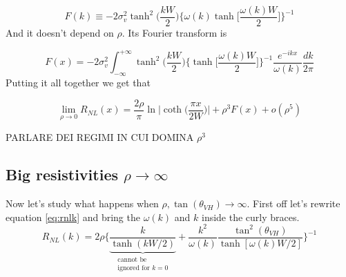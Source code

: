 \begin{equation}
    F(k)\equiv -2\sigma_v^2\tanh^2\bigg(\frac{kW}2\bigg)\bigg\{\omega(k)\tanh\bigg[\frac{\omega(k) W}2\bigg]\bigg\}^{-1}
\end{equation}
And it doesn't depend on $\rho$. Its Fourier transform is 

\begin{equation}
    F(x)=-2\sigma_{v}^2\int_{-\infty}^{+\infty}\tanh^2\bigg(\frac{kW}2\bigg)\bigg\{\tanh\bigg[\frac{\omega(k) W}2\bigg]\bigg\}^{-1}\frac{e^{-ikx}}{\omega(k)}\frac{dk}{2\pi}
\end{equation}
Putting it all together we get that

\begin{equation}
    \lim_{\rho\to 0} R_{NL}(x)=
    \frac{2\rho}\pi\ln\bigg |\coth \Big(\frac{\pi x}{2W}\Big)\bigg | +
    \rho^3F(x) +
    o(\rho^5)
    \label{eq:lowrho}
\end{equation}

PARLARE DEI REGIMI IN CUI DOMINA $\rho^3$



















\subsection{Big resistivities $\rho\to \infty$}
\label{sec:highrho}
Now let's study what happens when $\rho,\tan(\theta_{VH})\to \infty$. First off let's rewrite equation \ref{eq:rnlk} and bring the $\omega(k)$ and $k$ inside the curly braces.
\begin{equation}
        R_{NL}(k)=2\rho
    \bigg\{
        \underbrace{\frac{k}{\tanh(kW/2)}}_{\substack{\text{cannot be}\\\text{ignored for } k=0}} + \frac {k^2}{\omega(k)}\frac{\tan^2(\theta_{VH})}{\tanh[\omega(k)W/2]}    
    \bigg\}^{-1}
    \label{eq:rhoinf1}
\end{equation}

